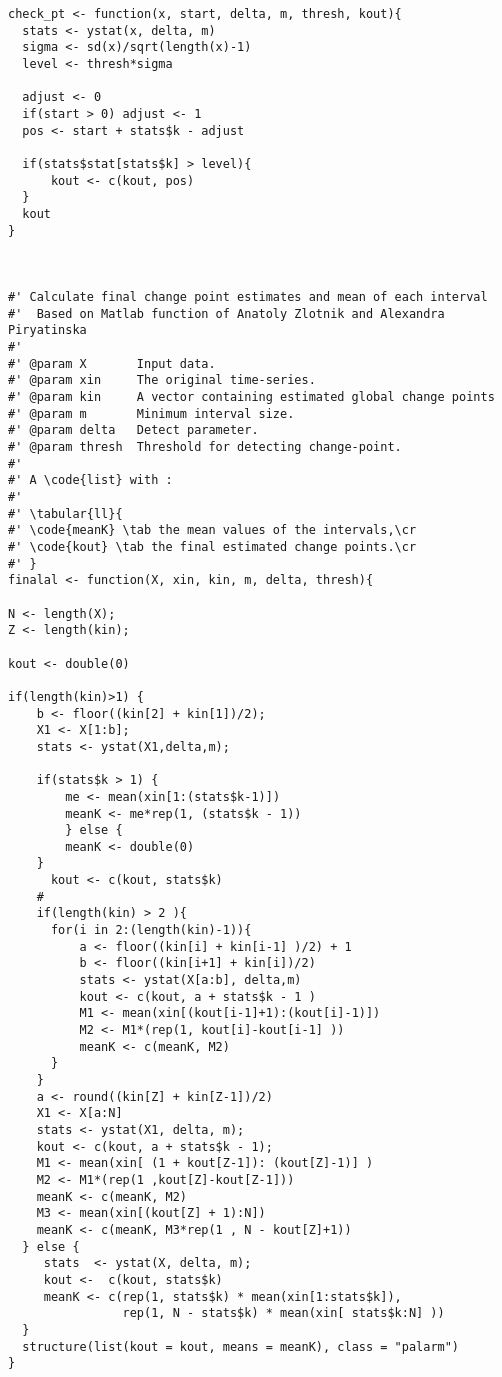 \begin{verbatim}
check_pt <- function(x, start, delta, m, thresh, kout){
  stats <- ystat(x, delta, m) 
  sigma <- sd(x)/sqrt(length(x)-1) 
  level <- thresh*sigma

  adjust <- 0
  if(start > 0) adjust <- 1
  pos <- start + stats$k - adjust

  if(stats$stat[stats$k] > level){
      kout <- c(kout, pos)
  }
  kout
}



#' Calculate final change point estimates and mean of each interval
#'  Based on Matlab function of Anatoly Zlotnik and Alexandra Piryatinska
#'    
#' @param X       Input data.
#' @param xin     The original time-series.
#' @param kin     A vector containing estimated global change points
#' @param m       Minimum interval size.
#' @param delta   Detect parameter.
#' @param thresh  Threshold for detecting change-point.
#'
#' A \code{list} with :
#'
#' \tabular{ll}{
#' \code{meanK} \tab the mean values of the intervals,\cr
#' \code{kout} \tab the final estimated change points.\cr
#' }
finalal <- function(X, xin, kin, m, delta, thresh){

N <- length(X); 
Z <- length(kin);

kout <- double(0) 

if(length(kin)>1) {
    b <- floor((kin[2] + kin[1])/2);
    X1 <- X[1:b];
    stats <- ystat(X1,delta,m);
    
    if(stats$k > 1) {
        me <- mean(xin[1:(stats$k-1)])
        meanK <- me*rep(1, (stats$k - 1))
        } else {
        meanK <- double(0)
    }
      kout <- c(kout, stats$k)
    # 
    if(length(kin) > 2 ){
      for(i in 2:(length(kin)-1)){
          a <- floor((kin[i] + kin[i-1] )/2) + 1
          b <- floor((kin[i+1] + kin[i])/2)
          stats <- ystat(X[a:b], delta,m)
          kout <- c(kout, a + stats$k - 1 )
          M1 <- mean(xin[(kout[i-1]+1):(kout[i]-1)])
          M2 <- M1*(rep(1, kout[i]-kout[i-1] ))
          meanK <- c(meanK, M2)
      }
    }
    a <- round((kin[Z] + kin[Z-1])/2)
    X1 <- X[a:N]
    stats <- ystat(X1, delta, m);
    kout <- c(kout, a + stats$k - 1);
    M1 <- mean(xin[ (1 + kout[Z-1]): (kout[Z]-1)] )
    M2 <- M1*(rep(1 ,kout[Z]-kout[Z-1]))
    meanK <- c(meanK, M2)
    M3 <- mean(xin[(kout[Z] + 1):N])
    meanK <- c(meanK, M3*rep(1 , N - kout[Z]+1))
  } else {
     stats  <- ystat(X, delta, m); 
     kout <-  c(kout, stats$k)
     meanK <- c(rep(1, stats$k) * mean(xin[1:stats$k]), 
                rep(1, N - stats$k) * mean(xin[ stats$k:N] )) 
  }
  structure(list(kout = kout, means = meanK), class = "palarm")
}


\end{verbatim}

